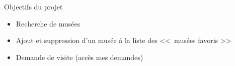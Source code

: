 \FlorentSpeak
\begin{frame}{Objectifs du projet} %
	\begin{itemize}
		\item Recherche de musées
		\vfill
		\item Ajout et suppression d'un musée à la liste des <<~musées favoris >>
		\vfill
		\item Demande de visite (accès mes demandes)
	\end{itemize}	
\end{frame}
